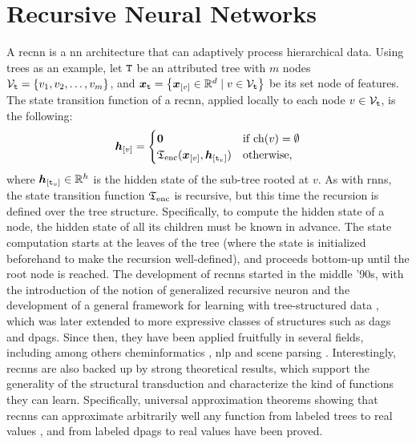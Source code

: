 \begin{figure*}[h!]
    \centering
    \resizebox{.7\textwidth}{!}{}
    \caption{The teacher forcing strategy for training a sequence generator with RNNs.}
    \label{fig:teacher-forcing}
\end{figure*}

\section{Recursive Neural Networks} \label{sec:recnns}
A \gls{recnn} \citep{sperduti1997generalizedneuron,frasconi1998general} is a \gls{nn} architecture that can adaptively process hierarchical data. Using trees as an example, let $\mathtt{T}$ be an attributed tree with $m$ nodes $\Nodes{t} = \Set{v_1, v_2, \ldots, v_m}$, and $\Vector{x}_{\Tree{t}} = \Set{\Elem{x}{v} \in \Real^d \mid v \in \Nodes{t}}$ be its set node of features. The state transition function of a \gls{recnn}, applied locally to each node $v \in \Nodes{t}$, is the following:
\begin{align*}
    \Elem{h}{v}=
    \begin{cases}
        \boldsymbol{0} & \mathrm{if}\; \Fun{ch}(v) = \emptyset\\
        \EncTrans(\Elem{x}{v}, \Elem{h}{\Tree{t}_v}) & \mathrm{otherwise},
    \end{cases}
\end{align*}
where $\Elem{h}{\Tree{t}_v} \in \Real^h$ is the hidden state of the sub-tree rooted at $v$. As with \glspl{rnn}, the state transition function $\mathfrak{T}_{\mathrm{enc}}$ is recursive, but this time the recursion is defined over the tree structure. Specifically, to compute the hidden state of a node, the hidden state of all its children must be known in advance. The state computation starts at the leaves of the tree (where the state is initialized beforehand to make the recursion well-defined), and proceeds bottom-up until the root node is reached.
The development of \glspl{recnn} started in the middle '90s, with the introduction of the notion of generalized recursive neuron \citep{sperduti1997generalizedneuron} and the development of a general framework for learning with tree-structured data \citep{frasconi1998general}, which was later extended to more expressive classes of structures such as \glspl{dag} and \glspl{dpag}. Since then, they have been applied fruitfully in several fields, including among others cheminformatics \citep{micheli2007introductionrecnncheminformatics,baldi2013recursiveneuralnets}, \gls{nlp} \citep{costa2000recnns,costa2003recnns,sturt2003recnns,socher2013recnnsentiment} and scene parsing \citep{socher2011parsingscenes}. Interestingly, \glspl{recnn} are also backed up by strong theoretical results, which support the generality of the structural transduction and characterize the kind of functions they can learn. Specifically, universal approximation theorems showing that \glspl{recnn} can approximate arbitrarily well any function from labeled trees to real values \citep{hammer1999recnn}, and from labeled \glspl{dpag} to real values \citep{hammer2005universal} have been proved.

